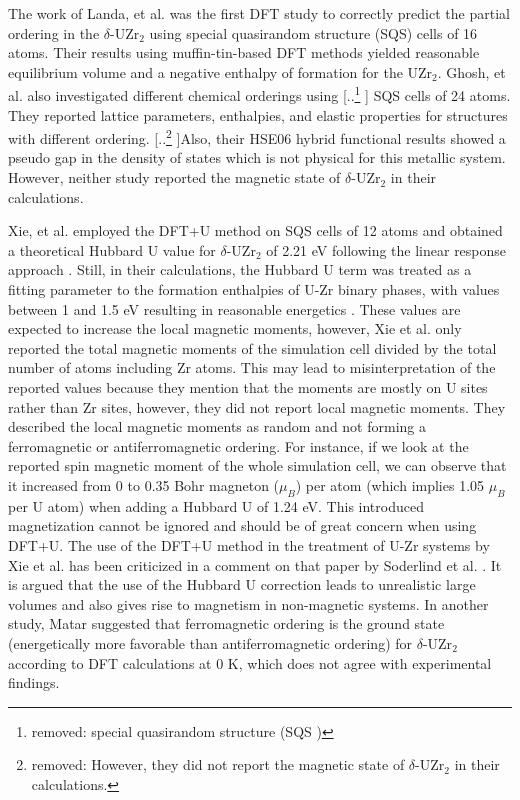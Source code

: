 \documentclass[preprint,12pt]{elsarticle}
\providecommand{\DIFadd}[1]{{\protect\color{blue} \sf #1}} %
\providecommand{\DIFdel}[1]{{\protect\color{red} [..\footnote{removed: #1} ]}} %
\providecommand{\DIFaddbegin}{} %
\providecommand{\DIFaddend}{} %
\providecommand{\DIFdelbegin}{} %
\providecommand{\DIFdelend}{} %
\newcommand{\DIFscaledelfig}{0.5}
\newlength{\DIFdelgraphicswidth} %
\newlength{\DIFdelgraphicsheight} %
\newcommand{\DIFaddincludegraphics}[2][]{{\color{blue}\fbox{\DIFOincludegraphics[#1]{#2}}}} %
\newcommand{\DIFdelincludegraphics}[2][]{%
\sbox{\DIFdelgraphicsbox}{\DIFOincludegraphics[#1]{#2}}%
\settoboxwidth{\DIFdelgraphicswidth}{\DIFdelgraphicsbox} %
\settoboxtotalheight{\DIFdelgraphicsheight}{\DIFdelgraphicsbox} %
\scalebox{\DIFscaledelfig}{%
\parbox[b]{\DIFdelgraphicswidth}{\usebox{\DIFdelgraphicsbox}\\[-\baselineskip] \rule{\DIFdelgraphicswidth}{0em}}\llap{\resizebox{\DIFdelgraphicswidth}{\DIFdelgraphicsheight}{%
\setlength{\unitlength}{\DIFdelgraphicswidth}%
\begin{picture}(1,1)%
\thicklines\linethickness{2pt} %
{\color[rgb]{1,0,0}\put(0,0){\framebox(1,1){}}}%
{\color[rgb]{1,0,0}\put(0,0){\line( 1,1){1}}}%
{\color[rgb]{1,0,0}\put(0,1){\line(1,-1){1}}}%
\end{picture}%
}\hspace*{3pt}}} %
} %
\DeclareRobustCommand{\DIFaddbegin}{\DIFOaddbegin \let\includegraphics\DIFaddincludegraphics} %
\DeclareRobustCommand{\DIFaddend}{\DIFOaddend \let\includegraphics\DIFOincludegraphics} %
\DeclareRobustCommand{\DIFdelbegin}{\DIFOdelbegin \let\includegraphics\DIFdelincludegraphics} %
\DeclareRobustCommand{\DIFdelend}{\DIFOaddend \let\includegraphics\DIFOincludegraphics} %
\begin{document}
\DIFaddbegin \DIFadd{The work of Landa, et al. \cite{landa_density-functional_2009} was the first DFT study to correctly predict the partial ordering in the $\delta$-UZr$_2$ using special quasirandom structure (SQS) cells of 16 atoms. Their results using muffin-tin-based DFT methods yielded reasonable equilibrium volume and a negative enthalpy of formation for the UZr$_2$.
}\DIFaddend Ghosh, et al. \cite{ghosh_chemical_2021} \DIFaddbegin \DIFadd{also }\DIFaddend investigated different chemical orderings using \DIFdelbegin \DIFdel{special quasirandom structure (SQS ) }\DIFdelend \DIFaddbegin \DIFadd{SQS }\DIFaddend cells of 24 atoms. They reported lattice parameters, enthalpies, and elastic properties for structures with different ordering.  \DIFdelbegin \DIFdel{However, they did not report the magnetic state of $\delta$-UZr$_2$ in their calculations. }\DIFdelend Also, their HSE06 hybrid functional results showed a pseudo gap in the density of states which is not physical for this metallic system. \DIFaddbegin \DIFadd{However, neither study \cite{landa_density-functional_2009, ghosh_chemical_2021} reported the magnetic state of $\delta$-UZr$_2$ in their calculations.
}

\DIFaddend Xie, et al. \cite{xie_correlation_2013} employed the DFT+U method on SQS cells of 12 atoms and obtained a theoretical Hubbard U value for $\delta$-UZr$_2$ of 2.21 eV following the linear response approach \cite{cococcioni_linear_2005}. Still, in their calculations, the Hubbard U term was treated as a fitting parameter to the formation enthalpies of U-Zr binary phases, with values between 1 and 1.5 eV resulting in reasonable energetics \cite{xie_correlation_2013}. These values are expected to increase the local magnetic moments, however, Xie et al. \cite{xie_correlation_2013} only reported the total magnetic moments of the simulation cell divided by the total number of atoms including Zr atoms. This may lead to misinterpretation of the reported values because they mention that the moments are mostly on U sites rather than Zr sites, however, they did not report local magnetic moments. They described the local magnetic moments as random and not forming a ferromagnetic or antiferromagnetic ordering. For instance, if we look at the reported spin magnetic moment of the whole simulation cell, we can observe that it increased from 0 to 0.35 Bohr magneton ($\mu_B$) per atom (which implies 1.05 $\mu_B$ per U atom) when adding a Hubbard U of 1.24 eV. This introduced magnetization cannot be ignored and should be of great concern when using DFT+U. The use of the DFT+U method in the treatment of U-Zr systems by Xie et al. \cite{xie_correlation_2013} has been criticized in a comment on that paper by Soderlind et al. \cite{soderlind_comment_2014}. It is argued that the use of the Hubbard U correction leads to unrealistic large volumes and also gives rise to magnetism in non-magnetic systems. In another study, Matar \cite{matar_first_2017} suggested that ferromagnetic ordering is the ground state (energetically more favorable than antiferromagnetic ordering) for $\delta$-UZr$_2$ according to DFT calculations at 0 K, which does not agree with experimental findings. 
\end{document}
